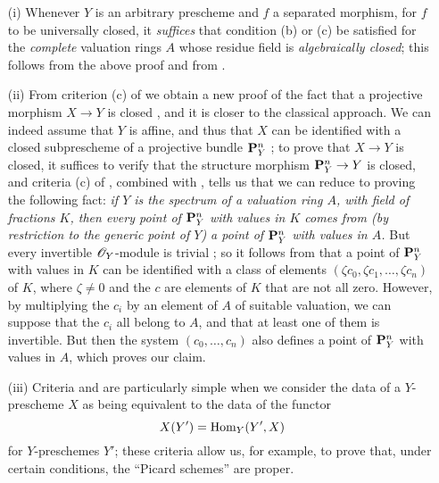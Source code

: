 \begin{remarks}
\label{II.7.3.9}
\begin{enumerate}
    \item[\rm{(i)}] Whenever $Y$ is an arbitrary prescheme and $f$ a separated morphism, for $f$ to be universally closed, it \emph{suffices} that condition (b) or (c) be satisfied for the \emph{complete} valuation rings $A$ whose residue field is \emph{algebraically closed};
        this follows from the above proof and from .
    \item[\rm{(ii)}] From criterion (c) of  we obtain a new proof of the fact that a projective morphism $X\to Y$ is closed , and it is closer to the classical approach.
        We can indeed assume that $Y$ is affine, and thus that $X$ can be identified with a closed subprescheme of a projective bundle $\mathbf{P}_Y^n$ ;
        to prove that $X\to Y$ is closed, it suffices to verify that the structure morphism $\bb{P}_Y^n\to Y$ is closed, and criteria (c) of , combined with , tells us that we can reduce to proving the following fact:
        \emph{if $Y$ is the spectrum of a valuation ring $A$, with field of fractions $K$, then every point of $\mathbf{P}_Y^n$ with values in $K$ comes from (by restriction to the generic point of $Y$) a point of $\mathbf{P}_Y^n$ with values in $A$.}
        But every invertible $\mathscr{O}_Y$-module is trivial ;
        so it follows from  that a point of $\mathbf{P}_Y^n$ with values in $K$ can be identified with a class of elements $(\zeta c_0,\zeta c_1,\ldots,\zeta c_n)$ of $K$, where $\zeta\neq0$ and the $c$ are elements of $K$ that are not all zero.
        However, by multiplying the $c_i$ by an element of $A$ of
        suitable valuation, we can suppose that the $c_i$ all belong to $A$, and that at least one of them is invertible.
        But then  the system $(c_0,\ldots,c_n)$ also defines a point of $\mathbf{P}_Y^n$ with values in $A$, which proves our claim.
    \item[\rm{(iii)}] Criteria  and  are particularly simple when we consider the data of a $Y$-prescheme $X$ as being equivalent to the data of the functor
        \[
            X(Y') = \operatorname{Hom}_Y(Y',X)
        \]
        for $Y$-preschemes $Y'$;
        these criteria allow us, for example, to prove that, under certain conditions, the ``Picard schemes'' are proper.
\end{enumerate}
\end{remarks}

